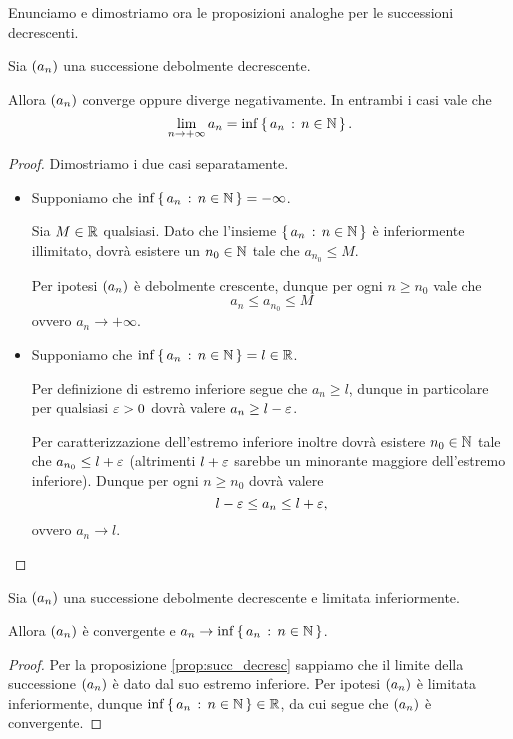 Enunciamo e dimostriamo ora le proposizioni analoghe per le successioni decrescenti.

\begin{proposition}
     \label{prop:succ_decresc}
    Sia $\seqn*{a}$ una successione debolmente decrescente. 
    
    Allora $\seqn*{a}$ converge oppure diverge negativamente. In entrambi i casi vale che \[
        \lim_{n \to +\infty} a_n = \inf \left\{\,a_n \,:\, n \in \mathbb{N}\,\right\}.    
    \]
\end{proposition}
\begin{proof}
    Dimostriamo i due casi separatamente. \begin{itemize}
        \item Supponiamo che $\inf \left\{\,a_n \,:\, n \in \mathbb{N}\,\right\} = -\infty$. 
        
        Sia $M \in \mathbb{R}$ qualsiasi. Dato che l'insieme $\left\{\,a_n \,:\, n \in \mathbb{N}\,\right\}$ è inferiormente illimitato, dovrà esistere un $n_0 \in \mathbb{N}$ tale che $a_{n_0} \leq M$.

        Per ipotesi $\seqn*{a}$ è debolmente crescente, dunque per ogni $n \geq n_0$ vale che \[
            a_n \leq a_{n_0} \leq M
        \] ovvero $a_n \to +\infty$.
        \item Supponiamo che $\inf \left\{\,a_n \,:\, n \in \mathbb{N}\,\right\} = l \in \mathbb{R}$. 
        
        Per definizione di estremo inferiore segue che $a_n \geq l$, dunque in particolare per qualsiasi $\varepsilon > 0$ dovrà valere $a_n \geq l - \varepsilon$.

        Per caratterizzazione dell'estremo inferiore inoltre dovrà esistere $n_0 \in \mathbb{N}$ tale che $a_{n_0} \leq l + \varepsilon$ (altrimenti $l + \varepsilon$ sarebbe un minorante maggiore dell'estremo inferiore). Dunque per ogni $n \geq n_0$ dovrà valere \[
            l - \varepsilon \leq a_n \leq l + \varepsilon, 
        \] ovvero $a_n \to l$. \qedhere
    \end{itemize}
\end{proof}

\begin{corollary}\label{cor:succ_decr_limit}
    Sia $\seqn*{a}$ una successione debolmente decrescente e limitata inferiormente. 
    
    Allora $\seqn*{a}$ è convergente e $a_n \to \inf \left\{\,a_n \,:\, n \in \mathbb{N}\,\right\}$.
\end{corollary}
\begin{proof}
    Per la proposizione \ref{prop:succ_decresc} sappiamo che il limite della successione $\seqn*{a}$ è dato dal suo estremo inferiore. Per ipotesi $\seqn*{a}$ è limitata inferiormente, dunque $\inf \left\{\,a_n \,:\, n \in \mathbb{N}\,\right\} \in \mathbb{R}$, da cui segue che $\seqn*{a}$ è convergente.
\end{proof}

